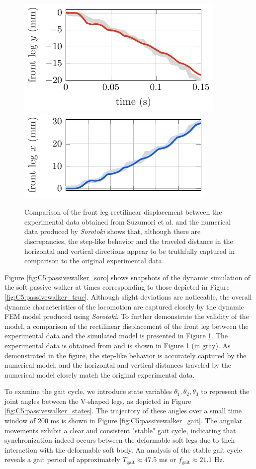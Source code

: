 %
\begin{figure}[!t]
    \includegraphics*[width=.495\textwidth]{./pdf/thesis-figure-6-19-1.pdf}
    \includegraphics*[width=.495\textwidth]{./pdf/thesis-figure-6-19-2.pdf}
    \caption{Comparison of the front leg rectilinear displacement between the experimental data obtained from Suzumori et al. \cite{Suzumori2008Sep} and the numerical data produced by \textit{Sorotoki} shows that, although there are discrepancies, the step-like behavior and the traveled distance in the horizontal and vertical directions appear to be truthfully captured in comparison to the original experimental data. }
    \label{fig:C5:passivewalker_compare}
\end{figure}
%

Figure \ref{fig:C5:passivewalker_soro} shows snapshots of the dynamic simulation of the soft passive walker at times corresponding to those depicted in Figure \ref{fig:C5:passivewalker_true}. Although slight deviations are noticeable, the overall dynamic characteristics of the locomotion are captured closely by the dynamic FEM model produced using \textit{Sorotoki}. To further demonstrate the validity of the model, a comparison of the rectilinear displacement of the front leg between the experimental data and the simulated model is presented in Figure \ref{fig:C5:passivewalker_compare}. The experimental data is obtained from \cite{Suzumori2008Sep} and is shown in Figure \ref{fig:C5:passivewalker_compare} (in gray). As demonstrated in the figure, the step-like behavior is accurately captured by the numerical model, and the horizontal and vertical distances traveled by the numerical model closely match the original experimental data.

To examine the gait cycle, we introduce state variables $\theta_1, \theta_2, \theta_3$ to represent the joint angles between the V-shaped legs, as depicted in Figure \ref{fig:C5:passivewalker_states}. The trajectory of these angles over a small time window of 200 \si{\milli \second} is shown in Figure \ref{fig:C5:passivewalker_gait}. The angular movements exhibit a clear and consistent "stable" gait cycle, indicating that synchronization indeed occurs between the deformable soft legs due to their interaction with the deformable soft body. An analysis of the stable gait cycle reveals a gait period of approximately $T_{\textrm{gait}} \approx 47.5$ \si{\milli \second} or $f_{\textrm{gait}} \approx 21.1$ \si{\hertz}.

